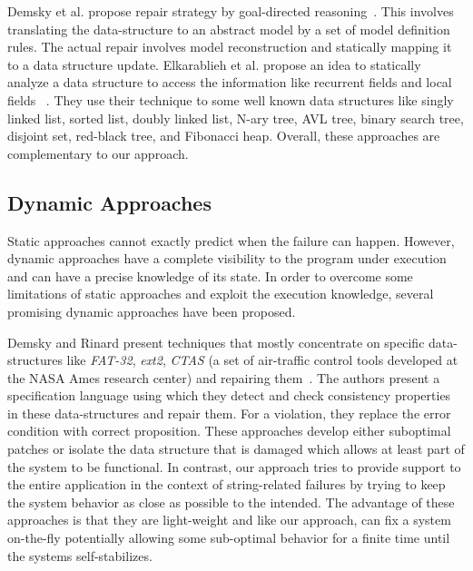 Demsky et al. propose repair strategy by goal-directed reasoning~\cite{conf/icse/DemskyR05}. This involves
translating the data-structure to an abstract model by a set of model definition
rules. The actual repair involves model reconstruction and statically mapping it
to a data structure update. Elkarablieh et al. propose an idea to statically analyze a data structure to
access the information like recurrent fields and local fields ~\cite{conf/oopsla/2007}. They use their
technique to some well known data structures like singly linked list, sorted
list, doubly linked list, N-ary tree, AVL tree, binary search tree, disjoint set,
red-black tree, and Fibonacci heap. Overall, these approaches are complementary to
our approach. 

\subsection{Dynamic Approaches}
Static approaches cannot exactly predict when the failure can happen. However,
dynamic approaches have a complete visibility to the program under execution and can
have a precise knowledge of its state. In order to overcome some limitations of static approaches
and exploit the execution knowledge, several promising dynamic approaches have
been proposed.

Demsky and Rinard present techniques that mostly concentrate on specific
data-structures like \emph{FAT-32}, \emph{ext2}, \emph{CTAS} (a set of
air-traffic control tools developed at the NASA Ames research center) and
repairing them~\cite{Demsky03automaticdata, conf/issre/DemskyR03,conf/oopsla/DemskyR03,
conf/issta/DemskyEGMPR06}. The authors present a specification language using which they
detect and check consistency properties in these data-structures and repair them.
For a violation, they replace the error condition with correct proposition.
These approaches develop either suboptimal patches or
isolate the data structure that is damaged which allows at least part of the
system to be functional. In contrast,
our approach tries to provide support to the entire application in the context of string-related failures
by trying to keep the system behavior
as close as possible to the intended. The advantage of these approaches is that they are
light-weight and like our approach, can fix a system on-the-fly
potentially allowing some sub-optimal behavior for a finite time until the
systems self-stabilizes.

